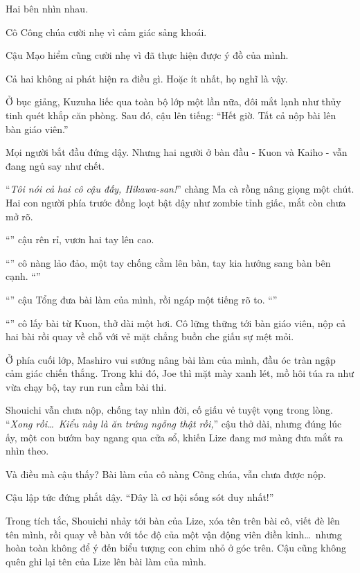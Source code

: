 \documentclass[../main.tex]{subfiles}
\begin{document}

Hai bên nhìn nhau.

Cô Công chúa cười nhẹ vì cảm giác sảng khoái.

Cậu Mạo hiểm cũng cười nhẹ vì đã thực hiện được ý đồ của mình.

Cả hai không ai phát hiện ra điều gì. Hoặc ít nhất, họ nghĩ là vậy.

Ở bục giảng, Kuzuha liếc qua toàn bộ lớp một lần nữa, đôi mắt lạnh như thủy tinh quét khắp căn phòng. Sau đó, cậu lên tiếng: ``Hết giờ. Tất cả nộp bài lên bàn giáo viên.''

Mọi người bắt đầu đứng dậy. Nhưng hai người ở bàn đầu - Kuon và Kaiho - vẫn đang ngủ say như chết.

``\textit{Tôi nói cả hai cô cậu đấy, Hikawa-san!}'' chàng Ma cà rồng nâng giọng một chút.  Hai con người phía trước đồng loạt bật dậy như zombie tỉnh giấc, mắt còn chưa mở rõ.

``'' cậu rên rỉ, vươn hai tay lên cao.

``'' cô nàng lảo đảo, một tay chống cằm lên bàn, tay kia hướng sang bàn bên cạnh. ``''

``'' cậu Tổng đưa bài làm của mình, rồi ngáp một tiếng rõ to. ``''

``'' cô lấy bài từ Kuon, thở dài một hơi. Cô lững thững tới bàn giáo viên, nộp cả hai bài rồi quay về chỗ với vẻ mặt chẳng buồn che giấu sự mệt mỏi.

Ở phía cuối lớp, Mashiro vui sướng nâng bài làm của mình, đầu óc tràn ngập cảm giác chiến thắng. Trong khi đó, Joe thì mặt mày xanh lét, mồ hôi túa ra như vừa chạy bộ, tay run run cầm bài thi.

Shouichi vẫn chưa nộp, chống tay nhìn đời, cố giấu vẻ tuyệt vọng trong lòng. ``\textit{Xong rồi\dots\ Kiểu này là ăn trứng ngỗng thật rồi,}'' cậu thở dài, nhưng đúng lúc ấy, một con bướm bay ngang qua cửa sổ, khiến Lize đang mơ màng đưa mắt ra nhìn theo.

Và điều mà cậu thấy? Bài làm của cô nàng Công chúa, vẫn chưa được nộp.

Cậu lập tức đứng phắt dậy. ``Đây là cơ hội sống sót duy nhất!''

Trong tích tắc, Shouichi nhảy tới bàn của Lize, xóa tên trên bài cô, viết đè lên tên mình, rồi quay về bàn với tốc độ của một vận động viên điền kinh\dots\ nhưng hoàn toàn không để ý đến biểu tượng con chim nhỏ ở góc trên. Cậu cũng không quên ghi lại tên của Lize lên bài làm của mình.
\end{document}
